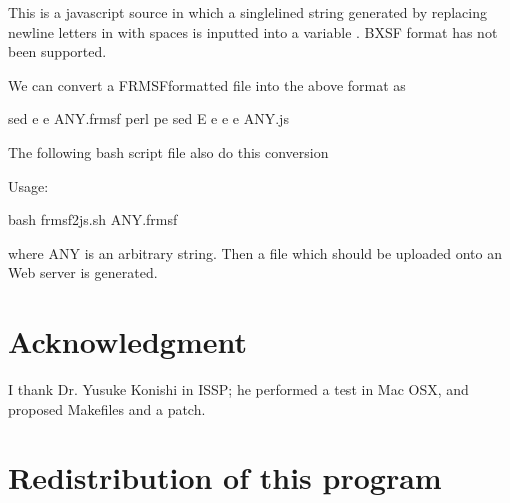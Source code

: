 \documentclass[letterpaper,10pt,pdftex,openany,english]{sphinxmanual}
\begin{document}
\sphinxAtStartPar
This is a javascript source in which
a single\sphinxhyphen{}lined string generated by replacing new\sphinxhyphen{}line letters in {\hyperref[\detokenize{input:input}]{}} with spaces
is inputted into a variable .
BXSF format has not been supported.

\sphinxAtStartPar
We can convert a FRMSF\sphinxhyphen{}formatted file into the above format as

\begin{sphinxVerbatim}[commandchars=\\\{\}]
sed \PYGZhy{}e  \PYGZhy{}e  ANY.frmsf  perl \PYGZhy{}pe   sed \PYGZhy{}E \PYGZhy{}e  \PYGZhy{}e  \PYGZhy{}e  \PYGZgt{} ANY.js
\end{sphinxVerbatim}

\sphinxAtStartPar
The following bash script file also do this conversion

\sphinxAtStartPar
{}

\sphinxAtStartPar
Usage:

\begin{sphinxVerbatim}[commandchars=\\\{\}]
\PYGZdl{} bash frmsf2js.sh ANY.frmsf
\end{sphinxVerbatim}

\sphinxAtStartPar
where ANY is an arbitrary string.
Then a file  which should be uploaded onto an Web server is generated.


\chapter{Acknowledgment}
\label{\detokenize{ack:acknowledgment}}\label{\detokenize{ack::doc}}
\sphinxAtStartPar
I thank Dr. Yusuke Konishi in ISSP; he performed a test in Mac OSX, and
proposed Makefiles and a patch.


\chapter{Re\sphinxhyphen{}distribution of this program}
\label{\detokenize{copy:re-distribution-of-this-program}}\label{\detokenize{copy::doc}}
\end{document}
